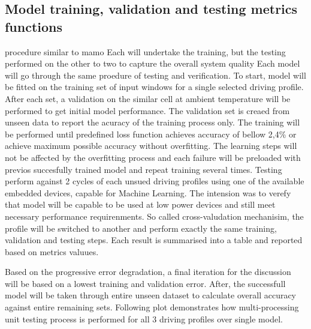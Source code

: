 \subsection{Model training, validation and testing metrics functions}
procedure similar to mamo
Each will undertake the training, but the testing performed on the other to two to capture the overall system quality
Each model will go through the same proedure of testing and verification.
To start, model will be fitted on the training set of input windows for a single selected driving profile.
After each set, a validation on the similar cell at ambient temperature will be performed to get initial model performance.
The validation set is creaed from unseen data to report the acuracy of the training process only.
The training will be performed until predefined loss function achieves accuracy of bellow 2,4\% or achieve maximum possible accuracy without overfitting.
The learning steps will not be affected by the overfitting process and each failure will be preloaded with previos succesfully trained model and repeat training several times.
%
Testing perform against 2 cycles of each unsued driving profiles using one of the available embedded devices, capable for Machine Learning.
The intension was to verefy that model will be capable to be used at low power devices and still meet necessary performance requirenments.
%
So called cross-valudation mechanisim, the profile will be switched to another and perform exactly the same training, validation and testing steps.
Each result is summarised into a table and reported based on metrics valuues.

Based on the progressive error degradation, a final iteration for the discussion will be based on a lowest training and validation error.
After, the successfull model will be taken through entire unseen dataset to calculate overall accuracy against entire remaining sets.
Following plot demonstrates how multi-processing unit testing process is performed for all 3 driving profiles over single model. 

